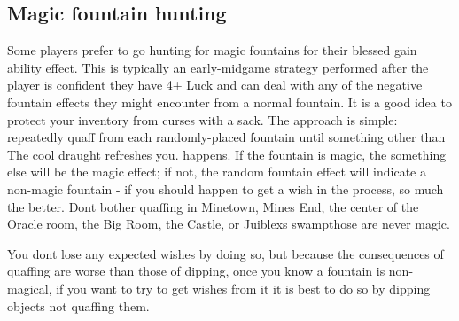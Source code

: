 \subsection{Magic fountain hunting}
\label{12}
Some players prefer to go hunting for magic fountains for their blessed gain ability effect. This is typically an early-{}midgame strategy performed after the player is confident they have 4+ Luck and can deal with any of the negative fountain effects they might encounter from a normal fountain. It is a good idea to protect your inventory from curses with a sack. The approach is simple: repeatedly quaff from each randomly-{}placed fountain until something other than The cool draught refreshes you. happens. If the fountain is magic, the something else will be the magic effect; if not, the random fountain effect will indicate a non-{}magic fountain -{} if you should happen to get a wish in the process, so much the better. Don\textquotesingle{}t bother quaffing in Minetown\footnotemark[100], Mines\textquotesingle{} End\footnotemark[101], the center of the Oracle room\footnotemark[102], the Big Room\footnotemark[103], the Castle\footnotemark[104], or Juiblex\textquotesingle{}s swamp\footnotemark[105]those are never magic. 


You don\textquotesingle{}t lose any expected wishes by doing so, but because the consequences of quaffing are worse than those of dipping, once you know a fountain is non-{}magical, if you want to try to get wishes from it it is best to do so by dipping objects not quaffing them.


